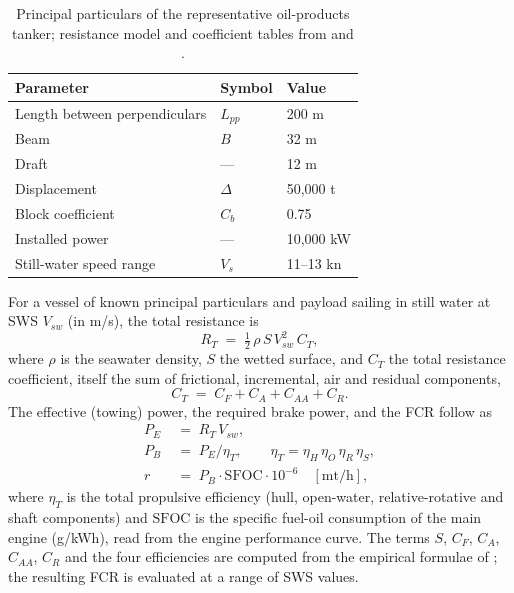 \documentclass[review,authoryear]{elsarticle}
\begin{document}
\begin{table}[ht]
\centering
\caption{Principal particulars of the representative oil-products tanker; resistance model and
coefficient tables from \citet{yang2020} and \citet{kristensen2012}.}
\label{tab:ship}
\begin{tabular}{lll}
\toprule
Parameter & Symbol & Value \\
\midrule
Length between perpendiculars & $L_{pp}$ & 200 m \\
Beam & $B$ & 32 m \\
Draft & --- & 12 m \\
Displacement & $\Delta$ & 50{,}000 t \\
Block coefficient & $C_b$ & 0.75 \\
Installed power & --- & 10{,}000 kW \\
Still-water speed range & $V_s$ & 11--13 kn \\
\bottomrule
\end{tabular}
\end{table}

For a vessel of known principal particulars and
payload sailing in still water at SWS $V_{sw}$ (in m/s), the total resistance is
\begin{equation}
\label{eq:app-rt}
R_T \;=\; \tfrac{1}{2}\,\rho\,S\,V_{sw}^{2}\,C_T ,
\end{equation}
where $\rho$ is the seawater density, $S$ the wetted surface, and $C_T$ the total resistance
coefficient, itself the sum of frictional, incremental, air and residual components,
\begin{equation}
\label{eq:app-ct}
C_T \;=\; C_F + C_A + C_{AA} + C_R .
\end{equation}
The effective (towing) power, the required brake power, and the FCR follow as
\begin{align}
P_E &\;=\; R_T\,V_{sw}, \label{eq:app-pe}\\
P_B &\;=\; P_E/\eta_T, \qquad \eta_T = \eta_H\,\eta_O\,\eta_R\,\eta_S, \label{eq:app-pb}\\
r   &\;=\; P_B\cdot \mathrm{SFOC}\cdot 10^{-6} \quad [\text{mt/h}], \label{eq:app-r}
\end{align}
where $\eta_T$ is the total propulsive efficiency (hull, open-water, relative-rotative and shaft
components) and $\mathrm{SFOC}$ is the specific fuel-oil consumption of the main engine (g/kWh), read
from the engine performance curve. The terms $S$, $C_F$, $C_A$, $C_{AA}$, $C_R$ and the four
efficiencies are computed from the empirical formulae of \citet{kristensen2012}; the resulting FCR is
evaluated at a range of SWS values.
\end{document}
